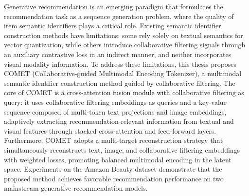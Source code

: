 

\begin{abstract}
  生成式推荐是一种将推荐问题转化为序列生成任务的新范式，其核心在于为每个物品构建高质量的语义标识符。
  现有的语义标识符构建方法，有的仅利用文本语义信息进行向量量化，有的虽然通过辅助对比损失引入了协同过滤信号，但其融合方式较为间接，且均未考虑视觉模态的信息。
  针对上述不足，本文提出了COMET（Collaborative-guided Multimodal Encoding Tokenizer），一种基于协同过滤引导的多模态语义标识符构建方法。
  COMET的核心是一个以协同过滤为查询的交叉注意力融合模块：以协同过滤嵌入作为查询向量，以文本多词元投影和图像嵌入构成的键值序列为键值对，通过堆叠的交叉注意力和前馈网络自适应地从文本和视觉特征中提取对推荐有用的信息。
  同时，COMET采用多目标重建策略，以加权方式同时重建文本、图像和协同过滤嵌入，促进多模态信息在隐空间中的均衡编码。
  在Amazon Beauty数据集上的实验表明，本文提出的方法构建的语义标识符在两种主流生成式推荐模型上均取得了较好的推荐性能。

\end{abstract}

\begin{abstract*}
  Generative recommendation is an emerging paradigm that formulates the recommendation task as a sequence generation problem, where the quality of item semantic identifiers plays a critical role.
  Existing semantic identifier construction methods have limitations: some rely solely on textual semantics for vector quantization, while others introduce collaborative filtering signals through an auxiliary contrastive loss in an indirect manner, and neither incorporates visual modality information.
  To address these limitations, this thesis proposes COMET (Collaborative-guided Multimodal Encoding Tokenizer), a multimodal semantic identifier construction method guided by collaborative filtering.
  The core of COMET is a cross-attention fusion module with collaborative filtering as query: it uses collaborative filtering embeddings as queries and a key-value sequence composed of multi-token text projections and image embeddings, adaptively extracting recommendation-relevant information from textual and visual features through stacked cross-attention and feed-forward layers.
  Furthermore, COMET adopts a multi-target reconstruction strategy that simultaneously reconstructs text, image, and collaborative filtering embeddings with weighted losses, promoting balanced multimodal encoding in the latent space.
  Experiments on the Amazon Beauty dataset demonstrate that the proposed method achieves favorable recommendation performance on two mainstream generative recommendation models.

\end{abstract*}
